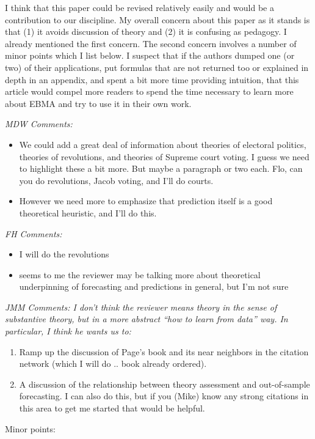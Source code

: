 \documentclass[10pt]{article}
\begin{document}
I think that this paper could be revised relatively easily and would
be a contribution to our discipline. My overall concern about this
paper as it stands is that (1) it avoids discussion of theory and (2)
it is confusing as pedagogy. I already mentioned the first
concern. The second concern involves a number of minor points which I
list below. I suspect that if the authors dumped one (or two) of their
applications, put formulas that are not returned too or explained in
depth in an appendix, and spent a bit more time providing intuition,
that this article would compel more readers to spend the time
necessary to learn more about EBMA and try to use it in their own work.

{\it  MDW Comments:
\begin{itemize}
\item We could add a great deal of information about theories of electoral politics,
theories of revolutions, and theories of Supreme court voting. I guess we need to highlight these a bit more. But maybe a paragraph or two each. Flo, can you do revolutions, Jacob voting, and I'll do courts.
\item However we need more to emphasize that prediction itself is a good theoretical heuristic, and I'll do this.
\end{itemize}
}

{\it  FH Comments:
\begin{itemize}
\item I will do the revolutions
\item seems to me the reviewer may be talking more about theoretical underpinning of forecasting and predictions in general, but I'm not sure
\end{itemize}
}

{\it  JMM Comments:
I don't think the reviewer means theory in the sense of substantive theory, but in a more abstract ``how to learn from data'' way.  In particular, I think he wants us to:
\begin{enumerate}
\item Ramp up the discussion of Page's book and its near neighbors in the citation network (which I will do .. book already ordered).
\item A discussion of the relationship between theory assessment and out-of-sample forecasting.  I can also do this, but if you (Mike) know any strong citations in this area to get me started that would be helpful.
\end{enumerate}
}


Minor points: 
\end{document}
